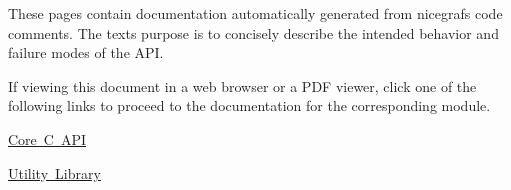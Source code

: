 These pages contain documentation automatically generated from nicegraf\textquotesingle{}s code comments. The text\textquotesingle{}s purpose is to concisely describe the intended behavior and failure modes of the API.

If viewing this document in a web browser or a PDF viewer, click one of the following links to proceed to the documentation for the corresponding module.


\begin{DoxyItemize}
\item \mbox{\hyperlink{group__ngf}{Core C API}}
\item \mbox{\hyperlink{group__ngf__util}{Utility Library}} 
\end{DoxyItemize}